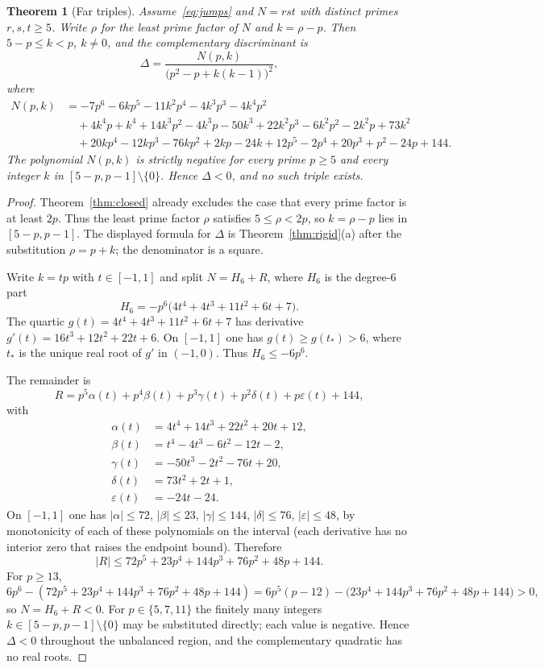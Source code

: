 \documentclass[11pt,reqno]{amsart}
\newtheorem{theorem}{Theorem}
\theoremstyle{definition}
\begin{document}
\begin{theorem}[Far triples]
\label{thm:rst-far}
Assume~\eqref{eq:jumps} and \(N=rst\) with distinct primes \(r,s,t\ge 5\). Write \(\rho\) for the least prime factor of \(N\) and \(k=\rho-p\). Then \(5-p\le k<p\), \(k\neq 0\), and the complementary discriminant is
\[
\Delta=\frac{N(p,k)}{\bigl(p^2-p+k(k-1)\bigr)^2},
\]
where
\begin{align*}
N(p,k)&=
-7p^6-6kp^5-11k^2p^4-4k^3p^3-4k^4p^2\\
&\quad+4k^4p+k^4+14k^3p^2-4k^3p-50k^3+22k^2p^3-6k^2p^2-2k^2p+73k^2\\
&\quad+20kp^4-12kp^3-76kp^2+2kp-24k+12p^5-2p^4+20p^3+p^2-24p+144.
\end{align*}
The polynomial \(N(p,k)\) is strictly negative for every prime \(p\ge 5\) and every integer \(k\) in \([5-p,p-1]\setminus\{0\}\). Hence \(\Delta<0\), and no such triple exists.
\end{theorem}

\begin{proof}
Theorem~\ref{thm:closed} already excludes the case that every prime factor is at least \(2p\). Thus the least prime factor \(\rho\) satisfies \(5\le\rho<2p\), so \(k=\rho-p\) lies in \([5-p,p-1]\). The displayed formula for \(\Delta\) is Theorem~\ref{thm:rigid}(a) after the substitution \(\rho=p+k\); the denominator is a square.

Write \(k=tp\) with \(t\in[-1,1]\) and split \(N=H_6+R\), where \(H_6\) is the degree-\(6\) part
\[
H_6=-p^6\bigl(4t^4+4t^3+11t^2+6t+7\bigr).
\]
The quartic \(g(t)=4t^4+4t^3+11t^2+6t+7\) has derivative \(g'(t)=16t^3+12t^2+22t+6\). On \([-1,1]\) one has \(g(t)\ge g(t_\ast)>6\), where \(t_\ast\) is the unique real root of \(g'\) in \((-1,0)\). Thus \(H_6\le -6p^6\).

The remainder is
\[
R=p^5\alpha(t)+p^4\beta(t)+p^3\gamma(t)+p^2\delta(t)+p\varepsilon(t)+144,
\]
with
\begin{align*}
\alpha(t)&=4t^4+14t^3+22t^2+20t+12,\\
\beta(t)&=t^4-4t^3-6t^2-12t-2,\\
\gamma(t)&=-50t^3-2t^2-76t+20,\\
\delta(t)&=73t^2+2t+1,\\
\varepsilon(t)&=-24t-24.
\end{align*}
On \([-1,1]\) one has \(\lvert\alpha\rvert\le 72\), \(\lvert\beta\rvert\le 23\), \(\lvert\gamma\rvert\le 144\), \(\lvert\delta\rvert\le 76\), \(\lvert\varepsilon\rvert\le 48\), by monotonicity of each of these polynomials on the interval (each derivative has no interior zero that raises the endpoint bound). Therefore
\[
\lvert R\rvert\le 72p^5+23p^4+144p^3+76p^2+48p+144.
\]
For \(p\ge 13\),
\[
6p^6-(72p^5+23p^4+144p^3+76p^2+48p+144)=6p^5(p-12)-\bigl(23p^4+144p^3+76p^2+48p+144\bigr)>0,
\]
so \(N=H_6+R<0\). For \(p\in\{5,7,11\}\) the finitely many integers \(k\in[5-p,p-1]\setminus\{0\}\) may be substituted directly; each value is negative. Hence \(\Delta<0\) throughout the unbalanced region, and the complementary quadratic has no real roots.
\end{proof}
\end{document}
